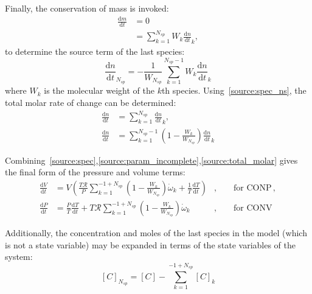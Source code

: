 \documentclass[12pt]{article}
\newcommand{\ns}{\ensuremath{{N_{sp}}}}
\newcommand{\conp}{CONP}
\newcommand{\conv}{CONV}
\newcommand{\dconp}{\ensuremath{,\qquad\text{for \conp}}}
\newcommand{\dconv}{\ensuremath{,\qquad\text{for \conv}}}
\newcommand{\Ru}{\ensuremath{\mathcal{R}}}
\begin{document}
Finally, the conservation of mass is invoked:
\begin{align*}
 \frac{\text{d} m }{\text{d} t } &= 0 \\
 &= \sum_{k=1}^{\ns}  W_{k} \frac{\text{d} n }{\text{d} t }_{k},
\end{align*}
to determine the source term of the last species:
\begin{equation}
 \frac{\text{d} n }{\text{d} t }_{\ns} = - \frac{1}{W_{\ns}} \sum_{k=1}^{\ns - 1} W_{k} \frac{\text{d} n }{\text{d} t }_{k}
 \label{source:spec_ns}
\end{equation}
where $W_{k}$ is the molecular weight of the $k$th species.
Using~\eqref{source:spec_ns}, the total molar rate of change can be determined:
\begin{align}
\frac{\text{d} n }{\text{d} t } &= \sum_{k=1}^{\ns} \frac{\text{d} n }{\text{d} t }_{k}, \nonumber \\
\frac{\text{d} n }{\text{d} t } &= \sum_{k=1}^{\ns - 1} \left(1 - \frac{W_{k}}{W_{\ns}}\right) \frac{\text{d} n }{\text{d} t }_{k}
\label{source:total_molar}
\end{align}

Combining~\eqref{source:spec},\eqref{source:param_incomplete},\eqref{source:total_molar} gives the final form of the pressure and volume terms:
\begin{subequations}
\label{source:param_complete}
\begin{align}
\frac{\text{d} V }{\text{d} t } &= V \left(\frac{T \Ru}{P} \sum_{k=1}^{-1 + \ns} \left(1 - \frac{W_{k}}{W_{\ns}}\right) \dot{\omega}_{k} + \frac{1}{T} \frac{\text{d} T }{\text{d} t }\right)&\dconp, \\
\frac{\text{d} P }{\text{d} t } &= \frac{P}{T} \frac{\text{d} T }{\text{d} t } + T \Ru \sum_{k=1}^{-1 + \ns} \left(1 - \frac{W_{k}}{W_{\ns}}\right) \dot{\omega}_{k}&\dconv
\end{align}
\end{subequations}

Additionally, the concentration and moles of the last species in the model (which is not a state variable) may be expanded in terms of the state variables of the system:
\begin{equation}
 \label{e:last_spec_conc}
   [C]_{\ns} = [C] - \sum_{k=1}^{-1 + \ns} [C]_{k}
\end{equation}
\end{document}
